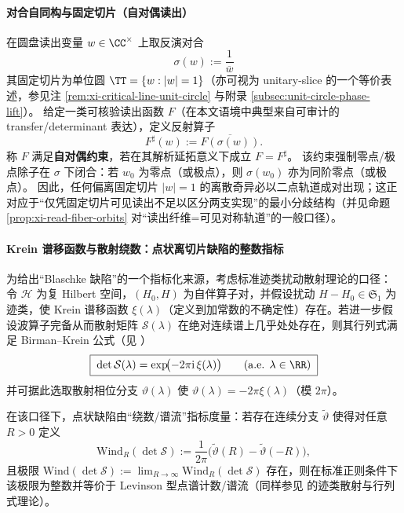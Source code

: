 \paragraph{对合自同构与固定切片（自对偶读出）}
在圆盘读出变量 \(w\in\CC^\times\) 上取反演对合
\[
\boxed{\;\sigma(w):=\frac{1}{\overline{w}}\;}
\]
其固定切片为单位圆 \(\TT=\{w:|w|=1\}\)（亦可视为 unitary-slice 的一个等价表述，参见注 \ref{rem:xi-critical-line-unit-circle} 与附录 \ref{subsec:unit-circle-phase-lift}）。
给定一类可核验读出函数 \(F\)（在本文语境中典型来自可审计的 transfer/determinant 表达），定义反射算子
\[
F^\sharp(w):=\overline{F(\sigma(w))}.
\]
称 \(F\) 满足\textbf{自对偶约束}，若在其解析延拓意义下成立 \(F=F^\sharp\)。
该约束强制零点/极点除子在 \(\sigma\) 下闭合：若 \(w_0\) 为零点（或极点），则 \(\sigma(w_0)\) 亦为同阶零点（或极点）。
因此，任何偏离固定切片 \(|w|=1\) 的离散奇异必以二点轨道成对出现；这正对应于“仅凭固定切片可见读出不足以区分两支实现”的最小分歧结构（并见命题 \ref{prop:xi-read-fiber-orbits} 对“读出纤维=可见对称轨道”的一般口径）。

\paragraph{Krein 谱移函数与散射绕数：点状离切片缺陷的整数指标}\label{par:selfdual-krein-wind}
为给出“Blaschke 缺陷”的一个指标化来源，考虑标准迹类扰动散射理论的口径：令 \(\mathcal H\) 为复 Hilbert 空间，\((H_0,H)\) 为自伴算子对，并假设扰动 \(H-H_0\in\mathfrak S_1\) 为迹类，使 Krein 谱移函数 \(\xi(\lambda)\)（定义到加常数的不确定性）存在。若进一步假设波算子完备从而散射矩阵 \(\mathcal S(\lambda)\) 在绝对连续谱上几乎处处存在，则其行列式满足 Birman--Krein 公式（见 \cite{Simon2005TraceIdeals,Yafaev1992ScatteringGeneralTheory}）
\begin{equation}\label{eq:birman-krein-detS-ssf}
\boxed{\;\det\mathcal S(\lambda)=\exp\!\bigl(-2\pi\mathrm{i}\,\xi(\lambda)\bigr)\qquad(\text{a.e. }\lambda\in\RR)\;}
\end{equation}
并可据此选取散射相位分支 \(\vartheta(\lambda)\) 使
\(\vartheta(\lambda)=-2\pi\xi(\lambda)\)（模 \(2\pi\)）。
\par
在该口径下，点状缺陷由“绕数/谱流”指标度量：若存在连续分支 \(\widetilde\vartheta\) 使得对任意 \(R>0\) 定义
\begin{equation}\label{eq:scattering-wind-def}
\mathrm{Wind}_R(\det\mathcal S)
:=\frac{1}{2\pi}\bigl(\widetilde\vartheta(R)-\widetilde\vartheta(-R)\bigr),
\end{equation}
且极限 \(\mathrm{Wind}(\det\mathcal S):=\lim_{R\to\infty}\mathrm{Wind}_R(\det\mathcal S)\) 存在，则在标准正则条件下该极限为整数并等价于 Levinson 型点谱计数/谱流（同样参见 \cite{Yafaev1992ScatteringGeneralTheory,Simon2005TraceIdeals} 的迹类散射与行列式理论）。

